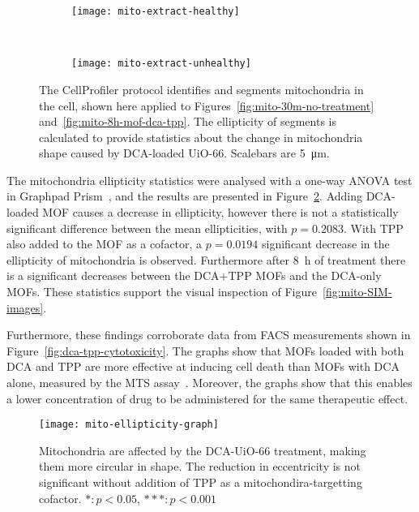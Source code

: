\begin{figure}[p]
\centering
	\begin{subfigure}[b]{0.49\textwidth}

\texttt{[image: mito-extract-healthy]}
	\caption{}
	\end{subfigure} ~
	\begin{subfigure}[b]{0.49\textwidth}
	\texttt{[image: mito-extract-unhealthy]}
	\caption{}
	\end{subfigure}
\caption[MOFs: Mitochondria segmentation in CellProfiler allow statistical shape analysis]{The CellProfiler\cite{carpenter2006cellprofiler} protocol identifies and segments mitochondria in the cell, shown here applied to Figures~\ref{fig:mito-30m-no-treatment} and~\ref{fig:mito-8h-mof-dca-tpp}. The ellipticity of segments is calculated to provide statistics about the change in mitochondria shape caused by DCA-loaded UiO-66. Scalebars are \SI{5}{\micro\metre}. }
\label{fig:cell-profiler-segmentation}
\end{figure}

The mitochondria ellipticity statistics were analysed with a one-way ANOVA test in Graphpad Prism~\cite{graphpadprism}, and the results are presented in Figure~\ref{fig:mito-ellipticity-graph}.
Adding DCA-loaded MOF causes a decrease in ellipticity, however there is not a statistically significant difference between the mean ellipticities, with $p=0.2083$.
With TPP also added to the MOF as a cofactor, a $p=0.0194$ significant decrease in the ellipticity of mitochondria is observed.
Furthermore after \SI{8}{\hour} of treatment there is a significant decreases between the DCA+TPP MOFs and the DCA-only MOFs.
These statistics support the visual inspection of Figure~\ref{fig:mito-SIM-images}.

Furthermore, these findings corroborate data from FACS measurements shown in Figure~\ref{fig:dca-tpp-cytotoxicity}.
The graphs show that MOFs loaded with both DCA and TPP are more effective at inducing cell death than MOFs with DCA alone, measured by the MTS assay~\cite{mosmann1983rapid, mtsassay}.
Moreover, the graphs show that this enables a lower concentration of drug to be administered for the same therapeutic effect.

\begin{figure}[htbp!]
\centering
\texttt{[image: mito-ellipticity-graph]}
\caption[MOFs: Mitochondria become more circular when treated with DCA and TPP delivered by UiO-66 MOF] {Mitochondria are affected by the DCA-UiO-66 treatment, making them more circular in shape. The reduction in eccentricity is not significant without addition of TPP as a mitochondira-targetting cofactor. $*: p<0.05$, $***: p<0.001$}
\label{fig:mito-ellipticity-graph}
\end{figure}

